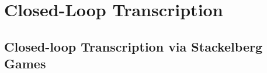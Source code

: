 \documentclass[../../book-main.tex]{subfiles}
\begin{document}
\section{Closed-Loop Transcription}
\label{sec:closed-loop-transcription}
\subsection{Closed-loop Transcription via Stackelberg Games}


\end{document}
